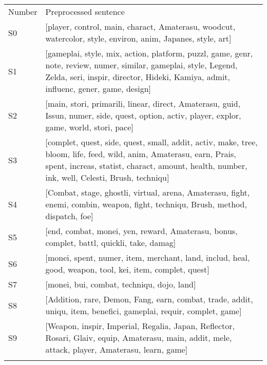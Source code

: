 \begin{tabular}{p{}p{}}
\noalign{\smallskip}\hline\noalign{\smallskip}
Number & Preprocessed sentence  \\
\noalign{\smallskip}\hline\noalign{\smallskip}

S0 & 
[player, control, main, charact, Amaterasu, woodcut, watercolor, style, environ, anim, Japanes, style, art]
\\

S1 & 
[gameplai, style, mix, action, platform, puzzl, game, genr, note, review, numer, similar, gameplai, style, Legend, Zelda, seri, inspir, director, Hideki, Kamiya, admit, influenc, gener, game, design]
\\

S2 & 
[main, stori, primarili, linear, direct, Amaterasu, guid, Issun, numer, side, quest, option, activ, player, explor, game, world, stori, pace]
\\

S3 & 
[complet, quest, side, quest, small, addit, activ, make, tree, bloom, life, feed, wild, anim, Amaterasu, earn, Prais, spent, increas, statist, charact, amount, health, number, ink, well, Celesti, Brush, techniqu]
\\

S4 & 
[Combat, stage, ghostli, virtual, arena, Amaterasu, fight, enemi, combin, weapon, fight, techniqu, Brush, method, dispatch, foe]
\\

S5 & 
[end, combat, monei, yen, reward, Amaterasu, bonus, complet, battl, quickli, take, damag]
\\

S6 & 
[monei, spent, numer, item, merchant, land, includ, heal, good, weapon, tool, kei, item, complet, quest]
\\

S7 & 
[monei, bui, combat, techniqu, dojo, land]
\\

S8 & 
[Addition, rare, Demon, Fang, earn, combat, trade, addit, uniqu, item, benefici, gameplai, requir, complet, game]
\\

S9 & 
[Weapon, inspir, Imperial, Regalia, Japan, Reflector, Rosari, Glaiv, equip, Amaterasu, main, addit, mele, attack, player, Amaterasu, learn, game]
\\

\noalign{\smallskip}\hline
\end{tabular} 
